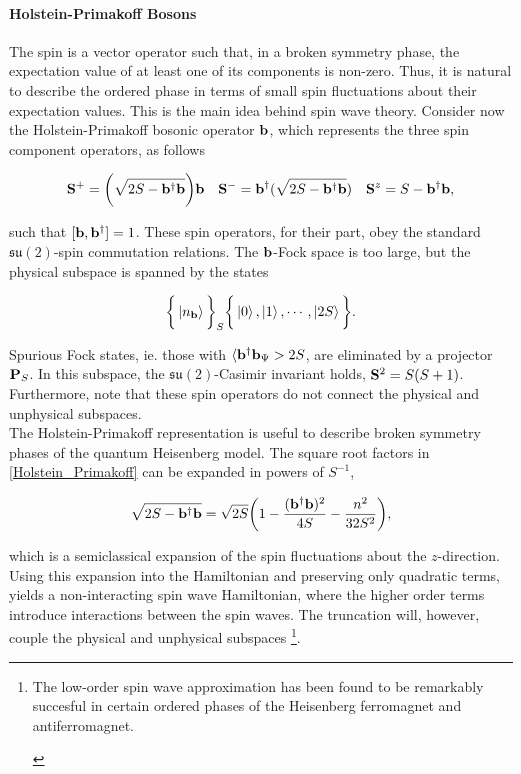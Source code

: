 \documentclass{homework}
\begin{document}
\paragraph{Holstein-Primakoff Bosons}

The spin is a vector operator such that, in a broken symmetry phase, the expectation value of at least one of its components is non-zero. Thus, it is natural to describe the ordered phase in terms of small spin fluctuations about their expectation values. This is the main idea behind spin wave theory. Consider now the Holstein-Primakoff bosonic operator ${\bf b}$, which represents the three spin component operators, as follows 

\begin{align}
    {\bf S}^+ &= \bigg(\sqrt{2 S - {\bf b}^\dagger {\bf b}}\bigg) {\bf b} & {\bf S}^- &= {\bf b}^\dagger (\sqrt{2 S - {\bf b}^\dagger {\bf b}}) & {\bf S}^z = S - {\bf b}^\dagger {\bf b}, 
    \label{Holstein_Primakoff}
\end{align}

such that $[{\bf b}, {\bf b}^\dagger] = 1$. These spin operators, for their part, obey the standard $\mathfrak{s}\mathfrak{u}(2)$-spin commutation relations. The ${\bf b}$-Fock space is too large, but the physical subspace is spanned by the states 

$$
    \bigg\{\ket{n_{\bf b}}\bigg\}_S \bigg\{ \ket{0}, \ket{1}, \cdots, \ket{2S}\bigg\}.
$$

Spurious Fock states, ie. those with $\langle{{\bf b}^\dagger {\bf b}}_{\Psi} > 2S$, are eliminated by a projector ${\bf P}_S$. In this subspace, the $\mathfrak{s}\mathfrak{u}(2)$-Casimir invariant holds, ${\bf S}^2 = S(S+1)$. Furthermore, note that these spin operators do not connect the physical and unphysical subspaces. \\

The Holstein-Primakoff representation is useful to describe broken symmetry phases of the quantum Heisenberg model. The square root factors in \cref{Holstein_Primakoff} can be expanded in powers of $S^{-1}$,

$$
    \sqrt{2 S - {\bf b}^\dagger {\bf b}} = \sqrt{2S} \bigg(1 - \frac{({\bf b}^\dagger {\bf b})^2}{4S} - \frac{n^2}{32 S^2}\bigg),
$$

which is a semiclassical expansion of the spin fluctuations about the $z$-direction. Using this expansion into the Hamiltonian and preserving only quadratic terms, yields a non-interacting spin wave Hamiltonian, where the higher order terms introduce interactions between the spin waves. The truncation will, however, couple the physical and unphysical subspaces \footnote{

\begin{tcolorbox}[colback=my-blue, 
title = Physical Context]

The low-order spin wave approximation has been found to be remarkably succesful in certain ordered phases of the Heisenberg ferromagnet and antiferromagnet. 

\end{tcolorbox}

}. \\
\end{document}
